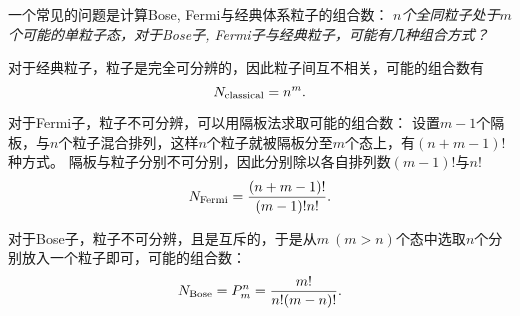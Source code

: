 \begin{tcolorbox}[breakable, colframe=blue, colback=blue!10, title={\textbf{Bose, Fermi与经典体系粒子的组合数计算}}]

    一个常见的问题是计算Bose, Fermi与经典体系粒子的组合数：
    $n$\emph{个全同粒子处于}$m$\emph{个可能的单粒子态，对于Bose子, Fermi子与经典粒子，可能有几种组合方式？}

    对于经典粒子，粒子是完全可分辨的，因此粒子间互不相关，可能的组合数有
    \begin{equation}
        N_{\rm{classical}} = n^m.
    \end{equation}

    对于Fermi子，粒子不可分辨，可以用隔板法求取可能的组合数：
    设置$m-1$个隔板，与$n$个粒子混合排列，这样$n$个粒子就被隔板分至$m$个态上，有$(n+m-1)!$种方式。
    隔板与粒子分别不可分别，因此分别除以各自排列数$(m-1)!$与$n!$
    \begin{equation}
        N_{\rm{Fermi}} = \frac{(n+m-1)!}{(m-1)! n!}.
    \end{equation}

    对于Bose子，粒子不可分辨，且是互斥的，于是从$m\ (m>n)$个态中选取$n$个分别放入一个粒子即可，可能的组合数：
    \begin{equation}
        N_{\rm{Bose}} = P_m^n = \frac{m!}{n!(m-n)!}.
    \end{equation}

\end{tcolorbox}
